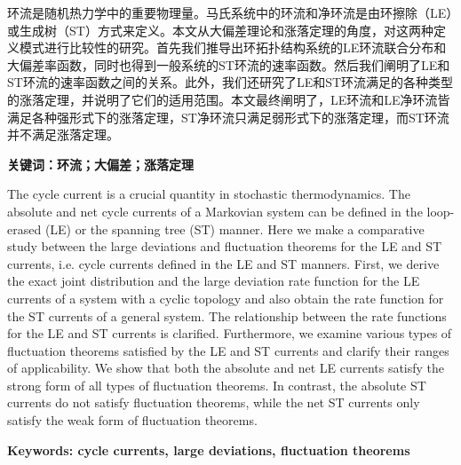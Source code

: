 
\setcounter{page}{1}
\song{}

环流是随机热力学中的重要物理量。马氏系统中的环流和净环流是由环擦除（LE）或生成树（ST）方式来定义。本文从大偏差理论和涨落定理的角度，对这两种定义模式进行比较性的研究。首先我们推导出环拓扑结构系统的LE环流联合分布和大偏差率函数，同时也得到一般系统的ST环流的速率函数。然后我们阐明了LE和ST环流的速率函数之间的关系。此外，我们还研究了LE和ST环流满足的各种类型的涨落定理，并说明了它们的适用范围。本文最终阐明了，LE环流和LE净环流皆满足各种强形式下的涨落定理，ST净环流只满足弱形式下的涨落定理，而ST环流并不满足涨落定理。

\vspace{\baselineskip}

\hangindent=52.3pt\noindent
{\bfseries\xiaosi\song 关键词：环流；大偏差；涨落定理}
\clearpage


The cycle current is a crucial quantity in stochastic thermodynamics. The absolute and net cycle currents of a Markovian system can be defined in the loop-erased (LE) or the spanning tree (ST) manner. Here we make a comparative study between the large deviations and fluctuation theorems for the LE and ST currents, i.e. cycle currents defined in the LE and ST manners. First, we derive the exact joint distribution and the large deviation rate function for the LE currents of a system with a cyclic topology and also obtain the rate function for the ST currents of a general system. The relationship between the rate functions for the LE and ST currents is clarified. Furthermore, we examine various types of fluctuation theorems satisfied by the LE and ST currents and clarify their ranges of applicability. We show that both the absolute and net LE currents satisfy the strong form of all types of fluctuation theorems. In contrast, the absolute ST currents do not satisfy fluctuation theorems, while the net ST currents only satisfy the weak form of fluctuation theorems.

\vspace{\baselineskip}

\hangindent=60pt\noindent
{\textbf{\xiaosi Keywords: cycle currents, large deviations, fluctuation theorems}}
\clearpage
